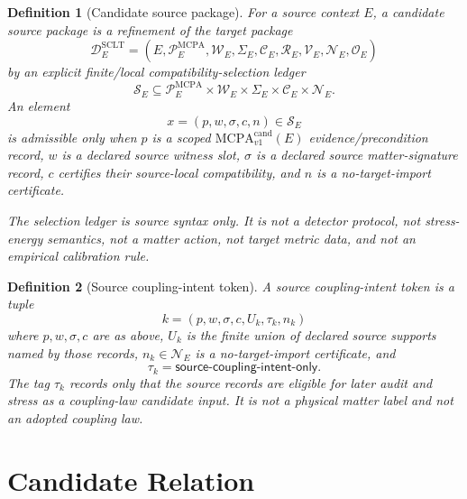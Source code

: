 \documentclass[11pt]{article}
\newcommand{\MCPA}{\mathrm{MCPA}^{\mathrm{cand}}_{v1}}
\newtheorem{definition}{Definition}
\begin{document}
\begin{definition}[Candidate source package]
For a source context \(E\), a candidate source package is a refinement of the
target package
\[
  \mathcal{D}^{\mathrm{SCLT}}_E =
  (E,\mathcal{P}^{\mathrm{MCPA}}_E,\mathcal{W}_E,\Sigma_E,
  \mathcal{C}_E,\mathcal{R}_E,\mathcal{V}_E,\mathcal{N}_E,\mathcal{O}_E)
\]
by an explicit finite/local compatibility-selection ledger
\[
  \mathcal{S}_E \subseteq
  \mathcal{P}^{\mathrm{MCPA}}_E \times \mathcal{W}_E \times
  \Sigma_E \times \mathcal{C}_E \times \mathcal{N}_E .
\]
An element
\[
  x=(p,w,\sigma,c,n)\in\mathcal{S}_E
\]
is admissible only when \(p\) is a scoped \(\MCPA(E)\)
evidence/precondition record, \(w\) is a declared source witness slot,
\(\sigma\) is a declared source matter-signature record, \(c\) certifies
their source-local compatibility, and \(n\) is a no-target-import
certificate.

The selection ledger is source syntax only. It is not a detector protocol,
not stress-energy semantics, not a matter action, not target metric data, and
not an empirical calibration rule.
\end{definition}

\begin{definition}[Source coupling-intent token]
A source coupling-intent token is a tuple
\[
  k=(p,w,\sigma,c,U_k,\tau_k,n_k)
\]
where \(p,w,\sigma,c\) are as above, \(U_k\) is the finite union of declared
source supports named by those records, \(n_k\in\mathcal{N}_E\) is a
no-target-import certificate, and
\[
  \tau_k=\mathsf{source\text{-}coupling\text{-}intent\text{-}only}.
\]
The tag \(\tau_k\) records only that the source records are eligible for
later audit and stress as a coupling-law candidate input. It is not a physical
matter label and not an adopted coupling law.
\end{definition}

\section{Candidate Relation}
\end{document}
